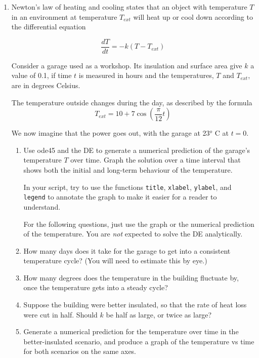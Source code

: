 \begin{enumerate}
\begin{Solution}
\end{Solution} 

\item 
\begin{Question}
Newton's law of heating and cooling states that an object with
  temperature $T$ in an environment at temperature $T_{ext}$ will heat
  up or cool down according to the differential equation

 $$\frac{dT}{dt} = -k (T - T_{ext})$$

 Consider a garage used as a workshop.  Its insulation and surface
 area give $k$ a value of 0.1, if time $t$ is measured in hours and
 the temperatures, $T$ and $T_{ext}$, are in degrees Celsius.

The temperature outside changes during the day, as described by
the formula 
$$T_{ext} =  10 + 7 \cos\left(\frac{\pi}{12} t\right)$$

We now imagine that the power goes out, with the garage at 23$^o$ C at
$t=0$.

\begin{enumerate}
\item Use ode45 and the DE to generate a numerical prediction of the
  garage's temperature $T$ over time.  Graph the solution over a time
  interval that shows both the initial and long-term behaviour of the
  temperature.

  In your script, try to use the functions \verb#title#,
  \verb#xlabel#, \verb#ylabel#, and \verb#legend# to annotate the
  graph to make it easier for a reader to understand.

  For the following questions, just use the graph or the numerical
  prediction of the temperature. You are {\em not} expected to solve
  the DE analytically.

\item How many days does it take for the garage to get into a
  consistent temperature cycle?  (You will need to estimate this by
  eye.)

\item How many degrees does the temperature in the building fluctuate
  by, once the temperature gets into a steady cycle?

\item Suppose the building were better insulated, so that the rate of
  heat loss were cut in half.  Should $k$ be half as large, or twice
  as large?  

\item Generate a numerical prediction for the temperature over time in
  the better-insulated scenario, and produce a graph of the
  temperature vs time for both scenarios on the same axes.
  

\end{enumerate}
\end{Question}
\end{enumerate}
